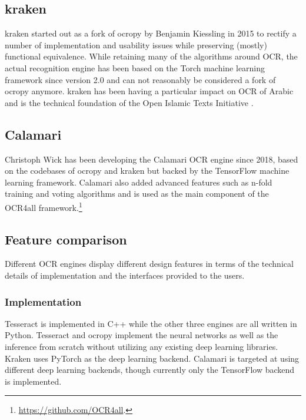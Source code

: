 \documentclass[sigconf]{acmart}
\begin{document}
\subsection{kraken}

kraken \cite{DBLP:journals/corr/RomanovMSK17} started out as a fork of ocropy
by Benjamin Kiessling in 2015 to rectify a number of implementation and usability
issues while preserving (mostly) functional equivalence. While retaining many of
the algorithms around OCR, the actual recognition engine has been based on the
Torch machine learning framework since version 2.0 and can not reasonably be
considered a fork of ocropy anymore. kraken has been having a particular impact
on OCR of Arabic and is the technical foundation of the Open Islamic Texts
Initiative \cite{miller_romanov_savant_2018}.


\subsection{Calamari}

Christoph Wick has been developing the Calamari
\cite{DBLP:journals/corr/abs-1807-02004} OCR engine since 2018, based on the
codebases of ocropy and kraken but backed by the TensorFlow machine learning
framework. Calamari also added advanced features such as n-fold training and
voting algorithms \cite{wickcomparison} and is used as the main component of the OCR4all
framework.\footnote{\url{https://github.com/OCR4all}.}

\subsection{Feature comparison}

Different OCR engines display different design features in terms of the
technical details of implementation and the interfaces provided to the users.

\subsubsection{Implementation}

Tesseract is implemented in C++ while the
other three engines are all written in Python. Tesseract and ocropy
implement the neural networks as well as the inference from scratch without
utilizing any existing deep learning libraries. Kraken uses PyTorch as the
deep learning backend. Calamari is targeted at using different deep learning backends,
though currently only the TensorFlow backend is implemented.
\end{document}
